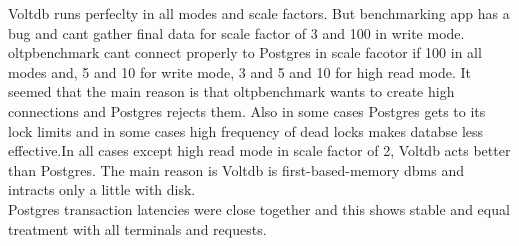 \documentclass[main.tex]{subfiles}
\begin{document}
Voltdb runs perfeclty in all modes and scale factors. But benchmarking app has a bug and cant gather final data for scale factor of 3 and 100 in write mode. oltpbenchmark cant connect properly to Postgres in scale facotor if 100 in all modes and, 5 and 10 for write mode, 3 and 5 and 10 for high read mode. It seemed that the main reason is that oltpbenchmark wants to create high connections  and Postgres rejects them. Also in some cases Postgres gets to its lock limits and in some cases high frequency of dead locks makes databse less effective.In all cases except high read mode in scale factor of 2, Voltdb acts better than Postgres. The main reason is Voltdb is first-based-memory dbms and intracts only a little with disk.\\
Postgres transaction latencies were close together and this shows stable and equal treatment with all terminals and requests.\\
\begin{minipage}{\textwidth}
\end{minipage}
\begin{minipage}{\textwidth}
\end{minipage}
\end{document}
